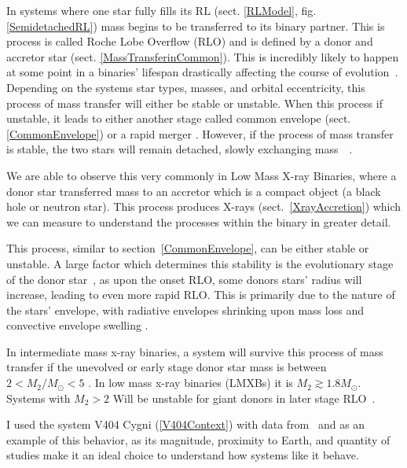 \documentclass[12pt, a4paper]{article}
\begin{document}
        In systems where one star fully fills its RL (sect. \ref{RLModel}, fig. \ref{SemidetachedRL}) mass begins to be transferred to its binary partner. This is process is called Roche Lobe Overflow (RLO) and is defined by a donor and accretor star (sect. \ref{MassTransferinCommon}). This is incredibly likely to happen at some point in a binaries' lifespan drastically affecting the course of evolution~\parencite{TaurisvandenHeuvel+2023}\parencite{Chen_2024}. Depending on the systems star types, masses, and orbital eccentricity, this process of mass transfer will either be stable or unstable. When this process if unstable, it leads to either another stage called common envelope (sect. \ref{CommonEnvelope}) or a rapid merger \parencite{TaurisvandenHeuvel+2023}. However, if the process of mass transfer is stable, the two stars will remain detached, slowly exchanging mass~\parencite{Chen_2024}~\parencite{TaurisvandenHeuvel+2023}.

        We are able to observe this very commonly in Low Mass X-ray Binaries, where a donor star transferred mass to an accretor which is a compact object (a black hole or neutron star). This process produces X-rays (sect.~\ref{XrayAccretion}) which we can measure to understand the processes within the binary in greater detail.

        This process, similar to section~\ref{CommonEnvelope}, can be either stable or unstable. A large factor which determines this stability is the evolutionary stage of the donor star~\parencite{TaurisvandenHeuvel+2023}, as upon the onset RLO, some donors stars' radius will increase, leading to even more rapid RLO. This is primarily due to the nature of the stars' envelope, with radiative envelopes shrinking upon mass loss and convective envelope swelling \parencite{TaurisvandenHeuvel+2023}.
        
        In intermediate mass x-ray binaries, a system will survive this process of mass transfer if the unevolved or early stage donor star mass is between $2 < M_2/M_\odot < 5$ \parencite{TaurisvandenHeuvel+2023}. In low mass x-ray binaries (LMXBs) it is $M_2 \gtrsim 1.8 M_\odot$. Systems with $M_2 > 2$ Will be unstable for giant donors in later stage RLO~\parencite{TaurisvandenHeuvel+2023}.
        
        I used the system V404 Cygni (\ref{V404Context}) with data from~\parencite{Bernardini_2016} and \parencite{Shahbaz_1994} as an example of this behavior, as its magnitude, proximity to Earth, and quantity of studies make it an ideal choice to understand how systems like it behave. 
\end{document}
